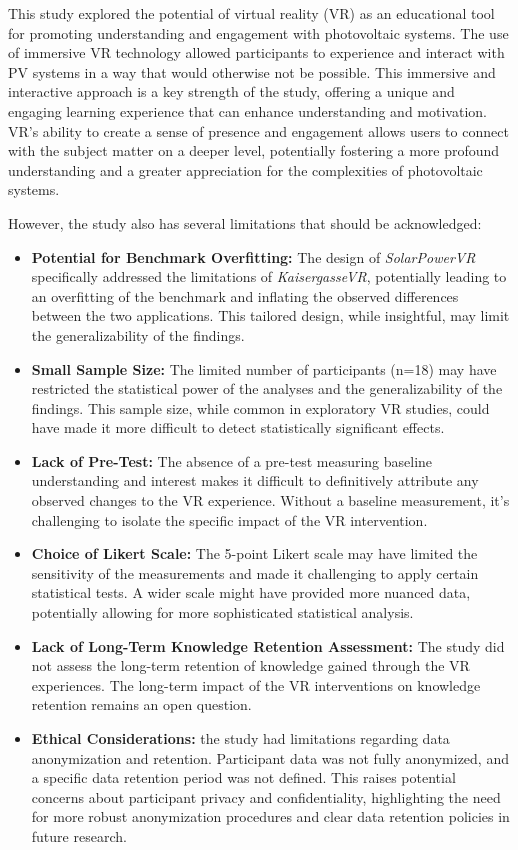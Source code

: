 \documentclass[draft, final]{vutinfth} %
\begin{document}
This study explored the potential of virtual reality (VR) as an educational tool for promoting understanding and engagement with photovoltaic systems. The use of immersive VR technology allowed participants to experience and interact with PV systems in a way that would otherwise not be possible. This immersive and interactive approach is a key strength of the study, offering a unique and engaging learning experience that can enhance understanding and motivation. VR's ability to create a sense of presence and engagement \cite{Winn2002Immersion, HuAu2018VrExperience} allows users to connect with the subject matter on a deeper level, potentially fostering a more profound understanding and a greater appreciation for the complexities of photovoltaic systems.

However, the study also has several limitations that should be acknowledged:

\begin{itemize}
    \item \textbf{Potential for Benchmark Overfitting:} The design of \textit{SolarPowerVR} specifically addressed the limitations of \textit{KaisergasseVR}, potentially leading to an overfitting of the benchmark and inflating the observed differences between the two applications. This tailored design, while insightful, may limit the generalizability of the findings.
    \item \textbf{Small Sample Size:} The limited number of participants (n=18) may have restricted the statistical power of the analyses and the generalizability of the findings. This sample size, while common in exploratory VR studies, could have made it more difficult to detect statistically significant effects. 
    \item \textbf{Lack of Pre-Test:} The absence of a pre-test measuring baseline understanding and interest makes it difficult to definitively attribute any observed changes to the VR experience. Without a baseline measurement, it's challenging to isolate the specific impact of the VR intervention. 
    \item \textbf{Choice of Likert Scale:} The 5-point Likert scale may have limited the sensitivity of the measurements and made it challenging to apply certain statistical tests. A wider scale might have provided more nuanced data, potentially allowing for more sophisticated statistical analysis. 
    \item \textbf{Lack of Long-Term Knowledge Retention Assessment:} The study did not assess the long-term retention of knowledge gained through the VR experiences. The long-term impact of the VR interventions on knowledge retention remains an open question.
    \item \textbf{Ethical Considerations:} the study had limitations regarding data anonymization and retention. Participant data was not fully anonymized, and a specific data retention period was not defined. This raises potential concerns about participant privacy and confidentiality, highlighting the need for more robust anonymization procedures and clear data retention policies in future research.
\end{itemize}
\end{document}
